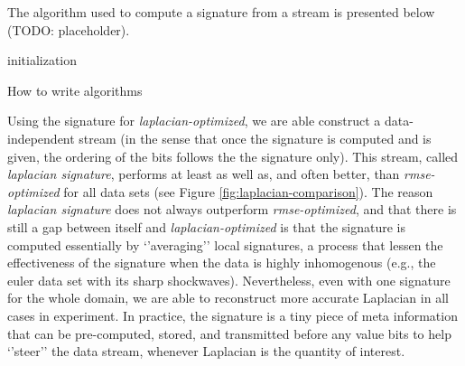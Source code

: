 The algorithm used to compute a signature from a stream is presented below (TODO: placeholder).
\begin{algorithm}[H]
  initialization\;
  \caption{How to write algorithms}
 \end{algorithm}

Using the signature for \emph{laplacian-optimized}, we are able construct a data-independent stream
(in the sense that once the signature is computed and is given, the ordering of the bits follows the
the signature only). This stream, called \emph{laplacian signature}, performs at least as well as,
and often better, than \emph{rmse-optimized} for all data sets (see Figure
\ref{fig:laplacian-comparison}). The reason \emph{laplacian signature} does not always outperform
\emph{rmse-optimized}, and that there is still a gap between itself and \emph{laplacian-optimized}
is that the signature is computed essentially by `'averaging'' local signatures, a process that
lessen the effectiveness of the signature when the data is highly inhomogenous (e.g., the euler data
set with its sharp shockwaves). Nevertheless, even with one signature for the whole domain, we are
able to reconstruct more accurate Laplacian in all cases in experiment. In practice, the signature
is a tiny piece of meta information that can be pre-computed, stored, and transmitted before any
value bits to help `'steer'' the data stream, whenever Laplacian is the quantity of interest.
